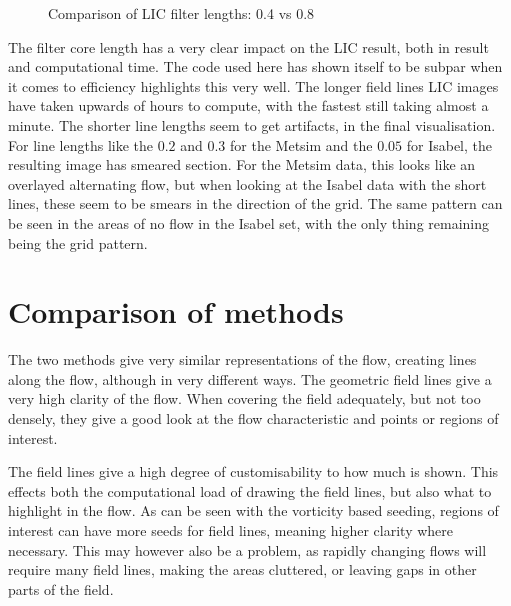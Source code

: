 \documentclass{article}
\begin{document}
\begin{figure}
\caption{Comparison of LIC filter lengths: 0.4 vs 0.8}
\end{figure}

The filter core length has a very clear impact on the LIC result, both in result
and computational time. The code used here has shown itself to be subpar when it comes to efficiency
highlights this very well. The longer field lines LIC images have taken upwards of hours to compute,
with the fastest still taking almost a minute. The shorter line lengths seem to get artifacts,
in the final visualisation. For line lengths like the $0.2$ and $0.3$ for the Metsim and the $0.05$
for Isabel, the resulting image has smeared section. For the Metsim data, this looks like an overlayed
alternating flow, but when looking at the Isabel data with the short lines, these seem to be smears
in the direction of the grid. The same pattern can be seen in the areas of no flow in the Isabel set,
with the only thing remaining being the grid pattern.

\section{Comparison of methods}
The two methods give very similar representations of the flow, creating lines along
the flow, although in very different ways. The geometric field lines give a very high
clarity of the flow. When covering the field adequately, but not too densely, they give a good look
at the flow characteristic and points or regions of interest.

The field lines give a high degree of customisability to how much is shown. This effects both the
computational load of drawing the field lines, but also what to highlight in the flow. As can be
seen with the vorticity based seeding, regions of interest can have more seeds for field lines,
meaning higher clarity where necessary. This may however also be a problem, as rapidly changing
flows will require many field lines, making the areas cluttered, or leaving gaps in other parts of
the field.
\end{document}
